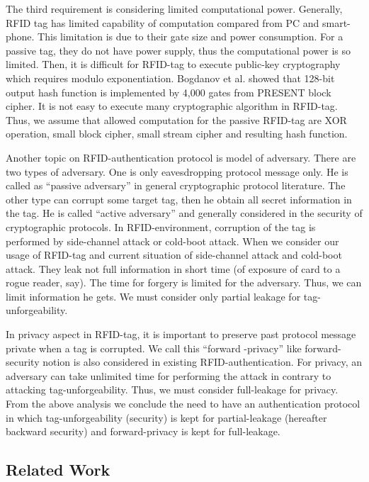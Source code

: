 \documentclass[english]{llncs}
\begin{document}
The third requirement is considering limited computational
power.  Generally, RFID tag has limited capability of computation
compared from PC and smart-phone.  This limitation is due to their
gate size and power consumption.  For a passive tag, they do not have
power supply, thus the computational power is so limited. Then, it is
difficult for RFID-tag to execute public-key cryptography which
requires modulo exponentiation.  Bogdanov et al. showed that 128-bit
output hash function is implemented by 4,000 gates from PRESENT block
cipher\cite{BLPPRS08}.  It is not easy to execute many cryptographic
algorithm in RFID-tag.  Thus, we assume that allowed computation for
the passive RFID-tag are XOR operation, small block cipher, small
stream cipher and resulting hash function.

Another topic on RFID-authentication protocol is model of adversary.
There are two types of adversary. One is only eavesdropping protocol
message only. He is called as ``passive adversary'' in general
cryptographic protocol literature. The other type can corrupt some
target tag, then he obtain all secret information in the tag. He is
called ``active adversary'' and generally considered in the security
of cryptographic protocols.  In RFID-environment, corruption of the
tag is performed by side-channel attack or cold-boot attack.  When we
consider our usage of RFID-tag and current situation of side-channel
attack and cold-boot attack.  They leak not full information in short
time (of exposure of card to a rogue reader, say). The time for
forgery is limited for the adversary. Thus, we can limit information
he gets. We must consider only partial leakage for tag-unforgeability.

In privacy aspect in RFID-tag, it is important to preserve past
protocol message private when a tag is corrupted.  We call this
``forward -privacy'' like forward-security notion is also considered
in existing RFID-authentication. For privacy, an adversary can take
unlimited time for performing the attack in contrary to attacking
tag-unforgeability.  Thus, we must consider full-leakage for privacy.
From the above analysis we conclude the need to have an authentication
protocol in which tag-unforgeability (security) is kept for
partial-leakage (hereafter backward security) and forward-privacy is
kept for full-leakage.

\subsection{Related Work}
%
%
\end{document}
